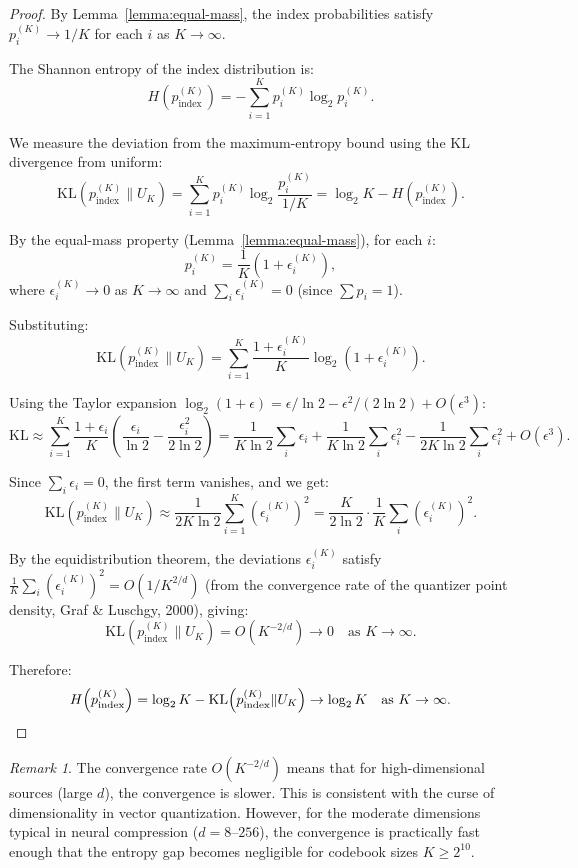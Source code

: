 \documentclass[11pt,a4paper]{article}
\theoremstyle{definition}
\theoremstyle{remark}
\newtheorem{remark}[theorem]{Remark}
\newcommand{\KL}{\mathrm{KL}}
\begin{document}
\begin{proof}
By Lemma~\ref{lemma:equal-mass}, the index probabilities satisfy
$p_i^{(K)} \to 1/K$ for each $i$ as $K \to \infty$.

The Shannon entropy of the index distribution is:
\[
H\!\left(p_{\mathrm{index}}^{(K)}\right) = -\sum_{i=1}^{K} p_i^{(K)} \log_2 p_i^{(K)}.
\]

We measure the deviation from the maximum-entropy bound using the KL
divergence from uniform:
\[
\KL\!\left(p_{\mathrm{index}}^{(K)} \| U_K\right)
= \sum_{i=1}^{K} p_i^{(K)} \log_2 \frac{p_i^{(K)}}{1/K}
= \log_2 K - H\!\left(p_{\mathrm{index}}^{(K)}\right).
\]

By the equal-mass property (Lemma~\ref{lemma:equal-mass}), for each $i$:
\[
p_i^{(K)} = \frac{1}{K}\left(1 + \epsilon_i^{(K)}\right),
\]
where $\epsilon_i^{(K)} \to 0$ as $K \to \infty$ and
$\sum_i \epsilon_i^{(K)} = 0$ (since $\sum p_i = 1$).

Substituting:
\[
\KL\!\left(p_{\mathrm{index}}^{(K)} \| U_K\right)
= \sum_{i=1}^{K} \frac{1+\epsilon_i^{(K)}}{K}
   \log_2\!\left(1 + \epsilon_i^{(K)}\right).
\]

Using the Taylor expansion $\log_2(1 + \epsilon) = \epsilon / \ln 2 - \epsilon^2 / (2\ln 2) + O(\epsilon^3)$:
\[
\KL \approx \sum_{i=1}^{K} \frac{1+\epsilon_i}{K}
   \left(\frac{\epsilon_i}{\ln 2} - \frac{\epsilon_i^2}{2\ln 2}\right)
= \frac{1}{K\ln 2}\sum_i \epsilon_i + \frac{1}{K\ln 2}\sum_i \epsilon_i^2
  - \frac{1}{2K\ln 2}\sum_i \epsilon_i^2 + O(\epsilon^3).
\]

Since $\sum_i \epsilon_i = 0$, the first term vanishes, and we get:
\[
\KL\!\left(p_{\mathrm{index}}^{(K)} \| U_K\right)
\approx \frac{1}{2K\ln 2}\sum_{i=1}^{K} \left(\epsilon_i^{(K)}\right)^2
= \frac{K}{2\ln 2} \cdot \frac{1}{K}\sum_i \left(\epsilon_i^{(K)}\right)^2.
\]

By the equidistribution theorem, the deviations $\epsilon_i^{(K)}$ satisfy
$\frac{1}{K}\sum_i (\epsilon_i^{(K)})^2 = O(1/K^{2/d})$ (from the convergence
rate of the quantizer point density, Graf \& Luschgy, 2000), giving:
\[
\KL\!\left(p_{\mathrm{index}}^{(K)} \| U_K\right)
= O\!\left(K^{-2/d}\right) \to 0 \quad \text{as } K \to \infty.
\]

Therefore:
\[
H\!\left(p_{\mathrm{index}}^{(K)}\right) = \log_2 K
- \KL\!\left(p_{\mathrm{index}}^{(K)} \| U_K\right)
\to \log_2 K \quad \text{as } K \to \infty. \qedhere
\]
\end{proof}

\begin{remark}
The convergence rate $O(K^{-2/d})$ means that for high-dimensional sources
(large $d$), the convergence is slower. This is consistent with the curse
of dimensionality in vector quantization. However, for the moderate
dimensions typical in neural compression ($d = 8$--$256$), the convergence
is practically fast enough that the entropy gap becomes negligible for
codebook sizes $K \geq 2^{10}$.
\end{remark}
\end{document}
